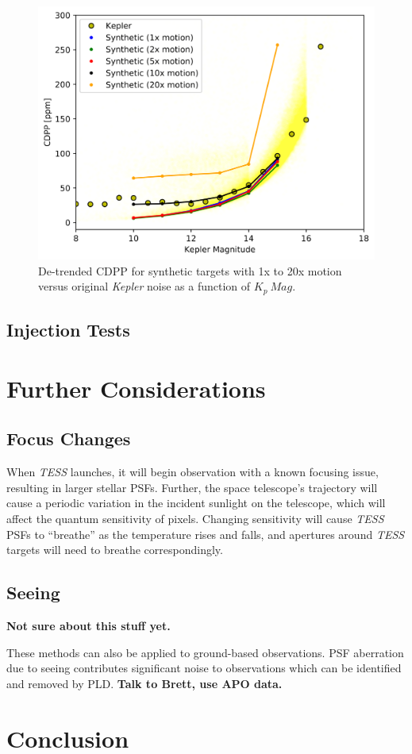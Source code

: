 \documentclass[12pt,preprint]{aastex}
\begin{document}
\begin{figure}[h]
	\centering
	\includegraphics[width=1.0\linewidth]{detmotion.png}
	\caption{De-trended CDPP for synthetic targets with 1x to 20x motion versus original \textit{Kepler} noise as a function of $K_p\ Mag$.}
	\label{fig:detmotion}
\end{figure}

\subsection{Injection Tests}

\section{Further Considerations}

\subsection{Focus Changes}

When \textit{TESS} launches, it will begin observation with a known focusing issue, resulting in larger stellar PSFs. Further, the space telescope's trajectory will cause a periodic variation in the incident sunlight on the telescope, which will affect the quantum sensitivity of pixels. Changing sensitivity will cause \textit{TESS} PSFs to ``breathe'' as the temperature rises and falls, and apertures around \textit{TESS} targets will need to breathe correspondingly.

\subsection{Seeing}

\textbf{Not sure about this stuff yet.}

These methods can also be applied to ground-based observations. PSF aberration due to seeing contributes significant noise to observations which can be identified and removed by PLD. \textbf{Talk to Brett, use APO data.}

\section{Conclusion}

\clearpage


\end{document}

